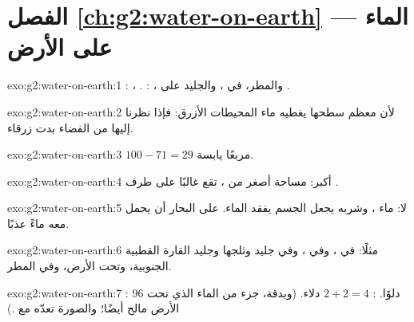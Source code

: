 \section*{الفصل \ref{ch:g2:water-on-earth} --- الماء على الأرض}

\begin{solution}{exo:g2:water-on-earth:1}
: ، . : ، والمطر،  في ،
والجليد على .
\end{solution}

\begin{solution}{exo:g2:water-on-earth:2}
لأن معظم سطحها يغطيه ماء المحيطات الأزرق: فإذا نظرنا إليها من الفضاء
بدت زرقاء.
\end{solution}

\begin{solution}{exo:g2:water-on-earth:3}
$100 - 71 = 29$ مربعًا يابسة.
\end{solution}

\begin{solution}{exo:g2:water-on-earth:4}
 أكبر:  مساحة أصغر من ، تقع غالبًا على طرف
.
\end{solution}

\begin{solution}{exo:g2:water-on-earth:5}
لا: ماء  ، وشربه يجعل الجسم يفقد الماء. على البحار أن
يحمل معه ماءً عذبًا.
\end{solution}

\begin{solution}{exo:g2:water-on-earth:6}
مثلًا: في ، وفي ، وفي جليد  وثلجها وجليد القارة
القطبية الجنوبية، وتحت الأرض، وفي المطر.
\end{solution}

\begin{solution}{exo:g2:water-on-earth:7}
: 96 دلوًا. : $2 + 2 = 4$ دلاء.
(وبدقة، جزء من الماء الذي تحت الأرض مالح أيضًا؛ والصورة تعدّه مع .)
\end{solution}

